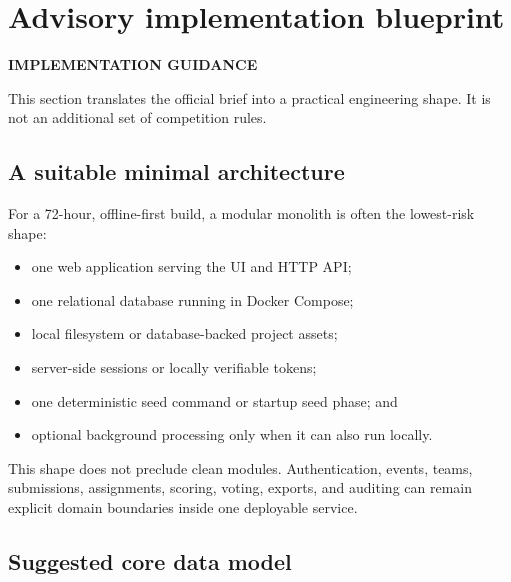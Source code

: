 \documentclass[11pt]{article}
\newcommand{\advisory}{\textcolor{DeepBlue}{\textbf{IMPLEMENTATION GUIDANCE}}}
\begin{document}
\section{Advisory implementation blueprint}

\advisory\par


This section translates the official brief into a practical engineering shape. It is not an additional set of competition rules.

\subsection{A suitable minimal architecture}

For a 72-hour, offline-first build, a modular monolith is often the lowest-risk shape:

\begin{itemize}
  \item one web application serving the UI and HTTP API\@;
  \item one relational database running in Docker Compose;
  \item local filesystem or database-backed project assets;
  \item server-side sessions or locally verifiable tokens;
  \item one deterministic seed command or startup seed phase; and
  \item optional background processing only when it can also run locally.
\end{itemize}

This shape does not preclude clean modules. Authentication, events, teams, submissions, assignments, scoring, voting, exports, and auditing can remain explicit domain boundaries inside one deployable service.

\subsection{Suggested core data model}
\end{document}
